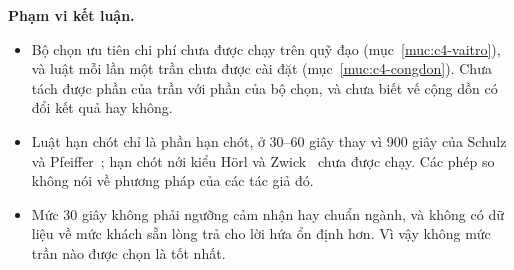 \textbf{Phạm vi kết luận.}
\begin{itemize}[leftmargin=1.2cm,itemsep=2pt,topsep=3pt]
\item Bộ chọn ưu tiên chi phí chưa được chạy trên quỹ đạo (mục~\ref{muc:c4-vaitro}), và luật mỗi lần một trần chưa
được cài đặt (mục~\ref{muc:c4-congdon}). Chưa tách được phần của trần với phần của bộ chọn, và chưa biết vế cộng dồn
có đổi kết quả hay không.
\item Luật hạn chót chỉ là phần hạn chót, ở 30--60 giây thay vì 900 giây của Schulz và Pfeiffer~\cite{schulz2026};
hạn chót nới kiểu Hörl và Zwick~\cite{horl2022} chưa được chạy. Các phép so không nói về phương pháp của các tác giả
đó.
\item Mức 30 giây không phải ngưỡng cảm nhận hay chuẩn ngành, và không có dữ liệu về mức khách sẵn lòng trả cho lời
hứa ổn định hơn. Vì vậy không mức trần nào được chọn là tốt nhất.
\end{itemize}
